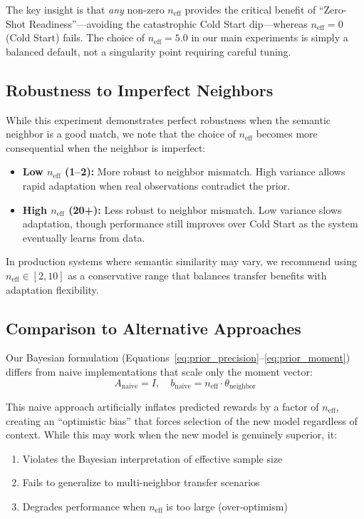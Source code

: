 The key insight is that \emph{any} non-zero $n_{\text{eff}}$ provides the critical 
benefit of ``Zero-Shot Readiness''---avoiding the catastrophic Cold Start dip---whereas 
$n_{\text{eff}}=0$ (Cold Start) fails. The choice of $n_{\text{eff}}=5.0$ in our 
main experiments is simply a balanced default, not a singularity point requiring 
careful tuning.

\subsection{Robustness to Imperfect Neighbors}

While this experiment demonstrates perfect robustness when the semantic neighbor is 
a good match, we note that the choice of $n_{\text{eff}}$ becomes more consequential 
when the neighbor is imperfect:

\begin{itemize}[leftmargin=*,noitemsep]
    \item \textbf{Low $n_{\text{eff}}$ (1--2):} More robust to neighbor mismatch. 
    High variance allows rapid adaptation when real observations contradict the prior.
    
    \item \textbf{High $n_{\text{eff}}$ (20+):} Less robust to neighbor mismatch. 
    Low variance slows adaptation, though performance still improves over Cold Start 
    as the system eventually learns from data.
\end{itemize}

In production systems where semantic similarity may vary, we recommend using 
$n_{\text{eff}} \in [2, 10]$ as a conservative range that balances transfer benefits 
with adaptation flexibility.

\subsection{Comparison to Alternative Approaches}

Our Bayesian formulation (Equations~\ref{eq:prior_precision}--\ref{eq:prior_moment}) 
differs from naive implementations that scale only the moment vector:
\begin{equation}
A_{\text{naive}} = I, \quad b_{\text{naive}} = n_{\text{eff}} \cdot \theta_{\text{neighbor}}
\end{equation}

This naive approach artificially inflates predicted rewards by a factor of $n_{\text{eff}}$, 
creating an ``optimistic bias'' that forces selection of the new model regardless of 
context. While this may work when the new model is genuinely superior, it:
\begin{enumerate}[leftmargin=*,noitemsep]
    \item Violates the Bayesian interpretation of effective sample size
    \item Fails to generalize to multi-neighbor transfer scenarios
    \item Degrades performance when $n_{\text{eff}}$ is too large (over-optimism)
\end{enumerate}

